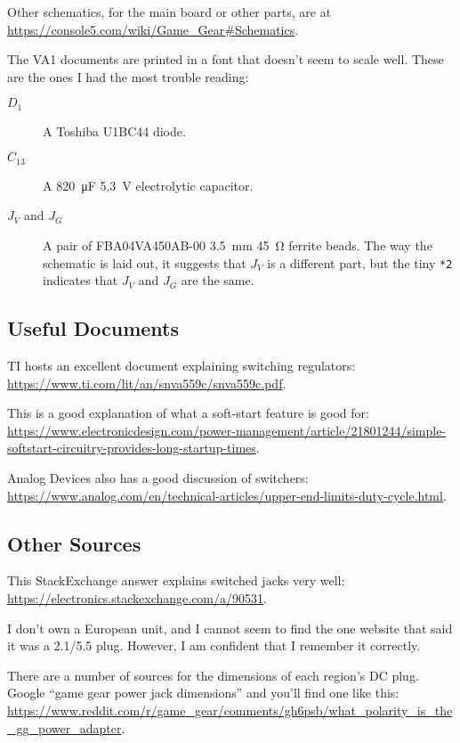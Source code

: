 \documentclass{article}
\newcommand{\model}{\textsf}
\begin{document}
Other schematics, for the main board or other parts, are at
\url{https://console5.com/wiki/Game_Gear#Schematics}.

The \model{VA1} documents are printed in a font that doesn't seem to
scale well. These are the ones I had the most trouble reading:

\begin{description}
\item[$D_1$] A Toshiba \model{U1BC44} diode.
\item[$C_{13}$] A \qty{820}{\micro\farad} \qty{5.3}{\volt}
  electrolytic capacitor.
  
\item[$J_V$ and $J_G$] A pair of \model{FBA04VA450AB-00}
  \qty{3.5}{\milli\meter} \qty{45}{\ohm} ferrite beads. The way the
  schematic is laid out, it suggests that $J_V$ is a different part,
  but the tiny \texttt{*2} indicates that $J_V$ and $J_G$ are the
  same.
\end{description}

\subsection{Useful Documents}
TI hosts an excellent document explaining switching regulators:
\url{https://www.ti.com/lit/an/snva559c/snva559c.pdf}.

This is a good explanation of what a soft-start feature is good for:
\url{https://www.electronicdesign.com/power-management/article/21801244/simple-softstart-circuitry-provides-long-startup-times}.

Analog Devices also has a good discussion of switchers:
\url{https://www.analog.com/en/technical-articles/upper-end-limits-duty-cycle.html}.

\subsection{Other Sources}
\label{sec:other_sources}
This Stack\-Ex\-change answer explains switched jacks very well:
\url{https://electronics.stackexchange.com/a/90531}.

I don't own a European unit, and I cannot seem to find the one website
that said it was a 2.1/5.5 plug. However, I am confident that I
remember it correctly.

There are a number of sources for the dimensions of each region's DC
plug. Google ``game gear power jack dimensions'' and you'll find one
like this: \url{https://www.reddit.com/r/game_gear/comments/gh6psb/what_polarity_is_the_gg_power_adapter}.
\end{document}
